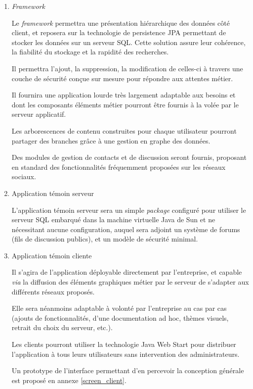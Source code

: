 \begin{enumerate}

 \item \textit{Framework}

Le \textit{framework} permettra une présentation hiérarchique des données côté client, et reposera sur la technologie de persistence JPA permettant de stocker les données sur un serveur SQL. Cette solution assure leur cohérence, la fiabilité du stockage et la rapidité des recherches.

Il permettra l'ajout, la suppression, la modification de celles-ci à travers une couche de sécurité conçue sur mesure pour répondre aux attentes métier.

Il fournira une application lourde très largement adaptable aux besoins et dont les composants éléments métier pourront être fournis à la volée par le serveur applicatif.

Les arborescences de contenu construites pour chaque utilisateur pourront partager des branches grâce à une gestion en graphe des données.

Des modules de gestion de contacts et de discussion seront fournis, proposant en standard des fonctionnalités fréquemment proposées sur les réseaux sociaux.

 \item Application témoin serveur

L'application témoin serveur sera un simple \emph{package} configuré pour utiliser le serveur SQL embarqué dans la machine virtuelle Java de Sun et ne nécessitant aucune configuration, auquel sera adjoint un système de forums (fils de discussion publics), et un modèle de sécurité minimal.

 \item Application témoin cliente

Il s'agira de l'application déployable directement par l'entreprise, et capable \emph{via} la diffusion des éléments graphiques métier par le serveur de s'adapter aux différents réseaux proposés.

Elle sera néanmoins adaptable à volonté par l'entreprise au cas par cas (ajouts de fonctionnalités, d'une documentation ad hoc, thèmes visuels, retrait du choix du serveur, etc.).

Les clients pourront utiliser la technologie Java Web Start pour distribuer l'application à tous leurs utilisateurs sans intervention des administrateurs.

Un prototype de l'interface permettant d'en percevoir la conception générale est proposé en annexe \ref{screen_client}.

\end{enumerate}